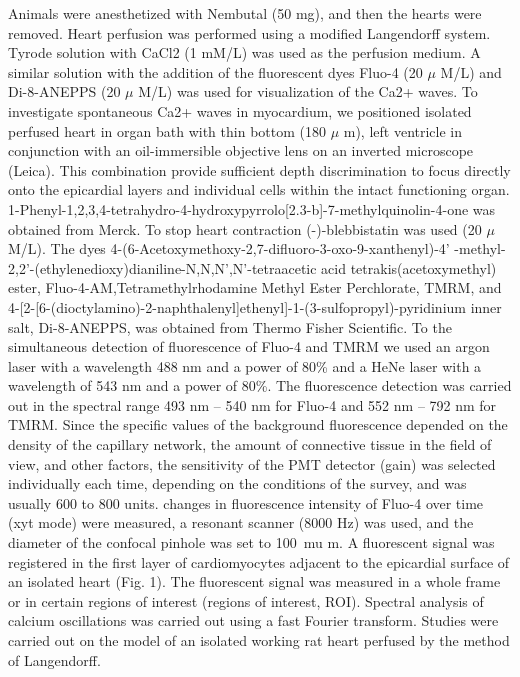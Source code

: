 \documentclass[a4paper,12pt]{article}
\begin{document}
Animals were anesthetized with Nembutal (50 mg), and then the hearts were removed.
Heart perfusion was performed using a modified Langendorff system. Tyrode solution with CaCl2 (1 mM/L) was used as the perfusion medium.
A similar solution with the addition of the fluorescent dyes Fluo-4 (20 $\mu$ M/L) and Di-8-ANEPPS (20 $\mu$ M/L) was used for visualization of the Ca2+ waves.
To investigate spontaneous Ca2+ waves in myocardium, we positioned isolated perfused heart in organ bath with thin bottom (180 $\mu$ m), left ventricle in conjunction with an oil-immersible objective lens on an inverted microscope (Leica).
This combination provide sufficient depth discrimination to focus directly onto the epicardial layers and individual cells within the intact functioning organ.
1-Phenyl-1,2,3,4-tetrahydro-4-hydroxypyrrolo[2.3-b]-7-methylquinolin-4-one was obtained from Merck.
To stop heart contraction (-)-blebbistatin was used (20 $\mu$ M/L).
The dyes 4-(6-Acetoxymethoxy-2,7-difluoro-3-oxo-9-xanthenyl)-4' -methyl-2,2'-(ethylenedioxy)dianiline-N,N,N',N'-tetraacetic acid tetrakis(acetoxymethyl) ester, Fluo-4-AM,Tetramethylrhodamine Methyl Ester Perchlorate, TMRM, and 4-[2-[6-(dioctylamino)-2-naphthalenyl]ethenyl]-1-(3-sulfopropyl)-pyridinium inner salt, Di-8-ANEPPS, was obtained from Thermo Fisher Scientific.
To the simultaneous detection of fluorescence of Fluo-4 and TMRM we used an argon laser with a wavelength 488 nm and a power of 80\% and a HeNe laser with a wavelength of 543 nm and a power of 80\%.
The fluorescence detection was carried out in the spectral range 493 nm -- 540 nm for Fluo-4 and 552 nm -- 792 nm for TMRM. Since the specific values of the background fluorescence depended on the density of the capillary network, the amount of connective tissue in the field of view, and other factors, the sensitivity of the PMT detector (gain) was selected individually each time, depending on the conditions of the survey, and was usually 600 to 800 units.
changes in fluorescence intensity of Fluo-4 over time (xyt mode) were measured, a resonant scanner (8000 Hz) was used, and the diameter of the confocal pinhole was set to 100\ mu m.
A fluorescent signal was registered in the first layer of cardiomyocytes adjacent to the epicardial surface of an isolated heart (Fig. 1). The fluorescent signal was measured in a whole frame or in certain regions of interest (regions of interest, ROI).
Spectral analysis of calcium oscillations was carried out using a fast Fourier transform.
Studies were carried out on the model of an isolated working rat heart perfused by the method of Langendorff.
\end{document}
